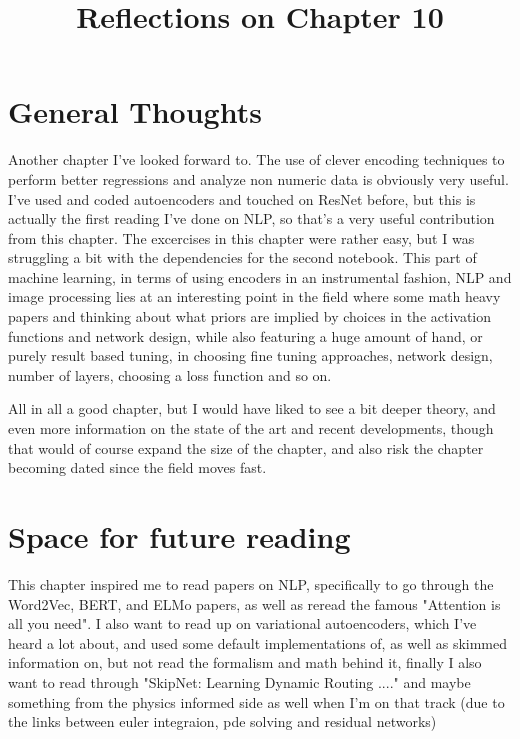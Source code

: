\documentclass[10pt, english]{article}
\begin{document}
\title{Reflections on Chapter 10}
\date{}
\author{}

\maketitle


\section*{General Thoughts}
Another chapter I've looked forward to. The use of clever encoding techniques to perform better regressions and analyze non numeric data is obviously very useful. I've used and coded autoencoders and touched on ResNet before, but this is actually the first reading I've done on 
NLP, so that's a very useful contribution from this chapter. The excercises in this chapter were rather easy, but I was struggling a bit with the dependencies for the second notebook. This part of machine learning, in terms of using encoders in an instrumental fashion, NLP and image
processing lies at an interesting point in the field where some math heavy papers and thinking about what priors are implied by choices in the activation functions and network design, while also featuring a huge amount of hand, or purely result based tuning, in choosing fine tuning approaches, network design,
number of layers, choosing a loss function and so on. 

All in all a good chapter, but I would have liked to see a bit deeper theory, and even more information on the state of the art and recent developments, though that would of course expand the size of the chapter, and also risk the chapter becoming dated since the field moves fast.


\section*{Space for future reading}
This chapter inspired me to read papers on NLP, specifically to go through the Word2Vec, BERT, and ELMo papers, as well as reread the famous "Attention is all you need". I also want to read up on variational autoencoders, which I've heard a lot about, and used some default implementations of,
as well as skimmed information on, but not read the formalism and math behind it, finally I also want to read through "SkipNet: Learning Dynamic Routing ...." and maybe something from the physics informed side as well when I'm on that track (due to the links between euler integraion, pde solving and residual networks)
\end{document}
